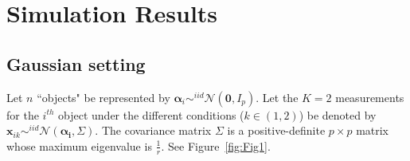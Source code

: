\documentclass[12pt]{article} %
\begin{document}

\section{Simulation Results\label{sec:Simulation Results}}
\subsection{Gaussian setting\label{subsec:GaussianSet}}

  Let $n$ ``objects" be represented  by  $\bm{\alpha}_i \sim^{iid} \mathcal{N}(\bm{0},I_p)$.  Let the $K=2$ measurements for the $i^{th}$ object under the different conditions ($k\in(1,2)$) be denoted  by $\bm{x}_{ik}  \sim^{iid} \mathcal{N}(\bm{\alpha_i},\Sigma)$. The covariance matrix
  $\Sigma$ is a positive-definite $p\times p$ matrix whose maximum eigenvalue is   $\frac{1}{r} $. See Figure~\ref{fig:Fig1}.
  
\end{document}

